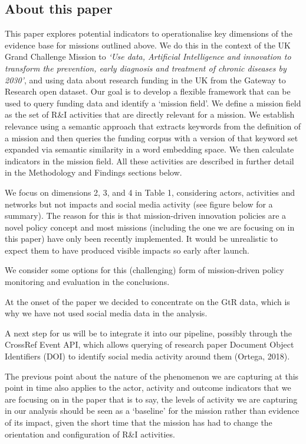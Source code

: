 \documentclass[11pt]{article}
\begin{document}
\subsection{About this paper}
\label{subsec: about}

This paper explores potential indicators to operationalise key dimensions of the evidence base for missions outlined above. We do this in the context of the UK Grand Challenge Mission to \textit{`Use data, Artificial Intelligence and innovation to transform the prevention, early diagnosis and treatment of chronic diseases by 2030'}, and using data about research funding in the UK from the Gateway to Research open dataset. Our goal is to develop a flexible framework that can be used to query funding data and identify a `mission field'. We define a mission field as the set of R&I activities that are directly relevant for a mission. We establish relevance using a semantic approach that extracts keywords from the definition of a mission and then queries the funding corpus with a version of that keyword set expanded via semantic similarity in a word embedding space. We then calculate indicators in the mission field. All these activities are described in further detail in the Methodology and Findings sections below.

We focus on dimensions 2, 3, and 4 in Table 1, considering actors, activities and networks but not impacts and social media activity (see figure below for a summary). The reason for this is that mission-driven innovation policies are a novel policy concept and most missions (including the one we are focusing on in this paper) have only been recently implemented. It would be unrealistic to expect them to have produced visible impacts so early after launch. 

We consider some options for this (challenging) form of mission-driven policy monitoring and evaluation in the conclusions. 

At the onset of the paper we decided to concentrate on the GtR data, which is why we have not used social media data in the analysis.

A next step for us will be to integrate it into our pipeline, possibly through the CrossRef Event API, which allows querying of research paper Document Object Identifiers (DOI) to identify social media activity around them (Ortega, 2018).

The previous point about the nature of the phenomenon we are capturing at this point in time also applies to the actor, activity and outcome indicators that we are focusing on in the paper \- that is to say, the levels of activity we are capturing in our analysis should be seen as a `baseline' for the mission rather than evidence of its impact, given the short time that the mission has had to change the orientation and configuration of R&I activities.
\end{document}
